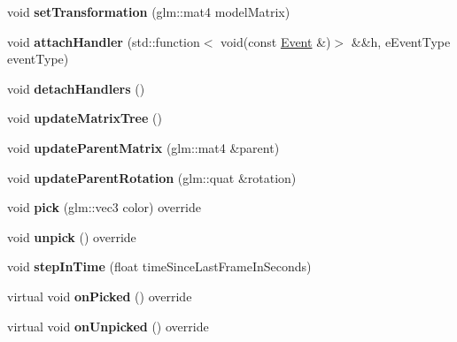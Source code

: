 \begin{DoxyCompactItemize}
void {\bfseries set\+Transformation} (glm\+::mat4 model\+Matrix)
\item 
\mbox{\label{classflw_1_1flf_1_1Entity_a63be691f4695e0b6f3857d76a492f336}} 
void {\bfseries attach\+Handler} (std\+::function$<$ void(const \hyperlink{classflw_1_1flf_1_1Event}{Event} \&)$>$ \&\&h, e\+Event\+Type event\+Type)
\item 
\mbox{\label{classflw_1_1flf_1_1Entity_add5276f3f27763b2fae1f9943e907ac8}} 
void {\bfseries detach\+Handlers} ()
\item 
\mbox{\label{classflw_1_1flf_1_1Entity_a1a155562e5efcb4523ba78c9f817fafb}} 
void {\bfseries update\+Matrix\+Tree} ()
\item 
\mbox{\label{classflw_1_1flf_1_1Entity_a7296824e646e0d2c4918f258c8af68ed}} 
void {\bfseries update\+Parent\+Matrix} (glm\+::mat4 \&parent)
\item 
\mbox{\label{classflw_1_1flf_1_1Entity_abfb12e4454297961e8345dc70eba43f6}} 
void {\bfseries update\+Parent\+Rotation} (glm\+::quat \&rotation)
\item 
\mbox{\label{classflw_1_1flf_1_1Entity_aabe261a3cbe923400f5b591e6c2dd782}} 
void {\bfseries pick} (glm\+::vec3 color) override
\item 
\mbox{\label{classflw_1_1flf_1_1Entity_a96099d66fce38fb7b4b98988d95dda21}} 
void {\bfseries unpick} () override
\item 
\mbox{\label{classflw_1_1flf_1_1Entity_a474045e44a35a301112da27abb3f6caa}} 
void {\bfseries step\+In\+Time} (float time\+Since\+Last\+Frame\+In\+Seconds)
\item 
\mbox{\label{classflw_1_1flf_1_1Entity_ac5ac6008e71514da1a33784ad5720ffd}} 
virtual void {\bfseries on\+Picked} () override
\item 
\mbox{\label{classflw_1_1flf_1_1Entity_aff51141b0c24382055de2eb39b289627}} 
virtual void {\bfseries on\+Unpicked} () override

\end{DoxyCompactItemize}
